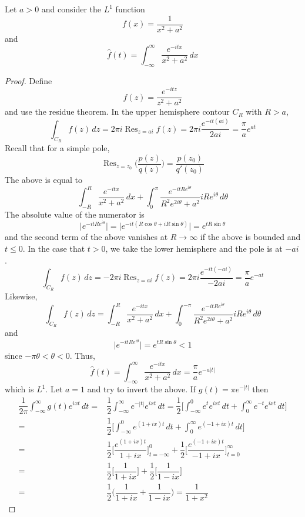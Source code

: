 \begin{ex}
Let $a>0$ and consider the $L^{1}$ function
\[f(x)=\dfrac{1}{x^2+a^2}\]
and
\[\hat{f}(t)=\int ^{\infty }_{-\infty }\dfrac{e^{-itx}}{x^2+a^2}\,dx\]
\end{ex}
\vspace{2ex}
\begin{proof}
Define 
\[f(z)=\dfrac{e^{-itz}}{z^2+a^2}\]
and use the residue theorem. In the upper hemisphere contour $C_{R}$ with $R>a$,
\[\int _{C_{R}}f(z)\,dz=2\pi i\mathop{\mathrm{Res}}_{z=ai}f(z)=2\pi i\dfrac{e^{-it(ai)}}{2ai}=\dfrac{\pi }{a}e^{at}\]
Recall that for a simple pole,
\[\mathop{\mathrm{Res}}_{z=z_0}\Big(\dfrac{p(z)}{q(z)}\Big)=\dfrac{p(z_0)}{q'(z_0)}\]
The above is equal to
\[\int _{-R}^{R}\dfrac{e^{-itx}}{x^2+a^2}\,dx+\int _{0}^{\pi }\dfrac{e^{-itRe^{i\theta }}}{R^2e^{2i\theta }+a^2}iRe^{i\theta }\,d\theta \]
The absolute value of the numerator is
\[\Big|e^{-itRe^{i\theta }}\Big|=\Big|e^{-it(R\cos \theta +iR\sin \theta )}\Big|=e^{tR\sin \theta }\]
and the second term of the above vanishes at $R\rightarrow \infty $ if the above is bounded and $t\leq 0$. In the case that $t>0$, we take the lower hemisphere and the pole is at $-ai$.
\[\int _{C_{R}}f(z)\,dz=-2\pi i\mathop{\mathrm{Res}}_{z=ai}f(z)=2\pi i\dfrac{e^{-it(-ai)}}{-2ai}=\dfrac{\pi }{a}e^{-a t}\]
Likewise,
\[\int _{C_{R}}f(z)\,dz=\int ^{R}_{-R}\dfrac{e^{-itx}}{x^2+a^2}\,dx+\int ^{-\pi }_{0}\dfrac{e^{-itRe^{i\theta }}}{R^2e^{2i\theta }+a^2}iRe^{i\theta }\,d\theta \]
and
\[\Big|e^{-itRe^{i\theta }}\Big|=e^{tR\sin \theta }<1\]
since $-\pi \theta <\theta <0$. Thus,
\[\hat{f}(t)=\int ^{\infty }_{-\infty }\dfrac{e^{-itx}}{x^2+a^2}\,dx=\dfrac{\pi }{a}e^{-a|t|}\]
which is $L^{1}$. Let $a=1$ and try to invert the above. If $g(t)=\pi e^{-|t|}$ then
\[\begin{align*}
\dfrac{1}{2\pi }\int ^{\infty }_{-\infty }g(t)e^{ixt}\,dt=&\dfrac{1}{2}\int _{-\infty }^{\infty }e^{-|t|}e^{ixt}\,dt=\dfrac{1}{2}\Big[\int^{0}_{-\infty }e^{t}e^{ixt}\,dt+\int ^{\infty }_{0}e^{-t}e^{ixt}\,dt\Big]\\
=&\dfrac{1}{2}\Big[\int ^{0}_{-\infty }e^{(1+ix)t}\,dt+\int ^{\infty }_{0}e^{(-1+ix)t}\,dt\Big]\\
=&\dfrac{1}{2}\Big[\dfrac{e^{(1+ix)t}}{1+ix}\Big]^{0}_{t=-\infty }+\dfrac{1}{2}\Big[\dfrac{e^{(-1+ix)t}}{-1+ix}\Big]^{\infty }_{t=0}\\
=&\dfrac{1}{2}\Big[\dfrac{1}{1+ix}\Big]+\dfrac{1}{2}\Big[\dfrac{1}{1-ix}\Big]\\
=&\dfrac{1}{2}\Big(\dfrac{1}{1+ix}+\dfrac{1}{1-ix}\Big)=\dfrac{1}{1+x^2}
\end{align*}\]
\end{proof}
